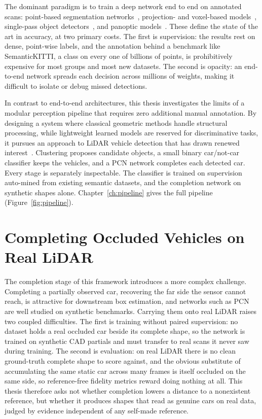 The dominant paradigm is to train a deep network end to end on annotated scans:
point-based segmentation networks~\cite{Qi_2017_CVPR,NIPS2017_d8bf84be,Hu_2020_CVPR},
projection- and voxel-based models~\cite{10.1109/ICRA.2018.8462926,milioto2019rangenet++,zhu2021cylindrical},
single-pass object detectors~\cite{lang2019pointpillars,yin2021centerpoint}, and
panoptic models~\cite{zhou2021panopticpolarnet,hong2021dsnet}. These define the state
of the art in accuracy, at two primary costs. The first is supervision: the
results rest on dense, point-wise labels, and the annotation behind a benchmark like
SemanticKITTI, a class on every one of billions of points, is prohibitively expensive for
most groups and most new datasets. The second is opacity: an end-to-end network spreads
each decision across millions of weights, making it difficult to isolate or debug
missed detections.

In contrast to end-to-end architectures, this thesis investigates the limits of a modular
perception pipeline that requires zero additional manual annotation. By designing a system
where classical geometric methods handle structural processing, while lightweight learned
models are reserved for discriminative tasks, it pursues an approach to LiDAR vehicle
detection that has drawn renewed interest~\cite{lim2025longrange}.
Clustering proposes candidate objects, a small binary car/not-car
classifier keeps the vehicles, and a PCN network completes each detected car. Every
stage is separately inspectable. The classifier is trained on supervision auto-mined
from existing semantic datasets, and the completion network on synthetic shapes alone. Chapter~\ref{ch:pipeline} gives the full pipeline
(Figure~\ref{fig:pipeline}).

\section{Completing Occluded Vehicles on Real LiDAR}
\label{sec:intro-challenges}

The completion stage of this framework introduces a more complex challenge. Completing a
partially observed car, recovering the far side the sensor cannot reach, is attractive
for downstream box estimation, and networks such as
PCN~\cite{yuan2019pcnpointcompletionnetwork} are well studied on synthetic benchmarks.
Carrying them onto real LiDAR raises two coupled difficulties. The first is training
without paired supervision: no dataset holds a real occluded car beside its complete
shape, so the network is trained on synthetic CAD partials and must transfer to real
scans it never saw during training. The second is evaluation: on real LiDAR there is no
clean ground-truth complete shape to score against, and the obvious substitute of
accumulating the same static car across many frames is itself occluded on the same side,
so reference-free fidelity metrics reward doing nothing at all. This thesis therefore asks
not whether completion lowers a distance to a nonexistent reference, but whether it
produces shapes that read as genuine cars on real data, judged by evidence independent of
any self-made reference.

